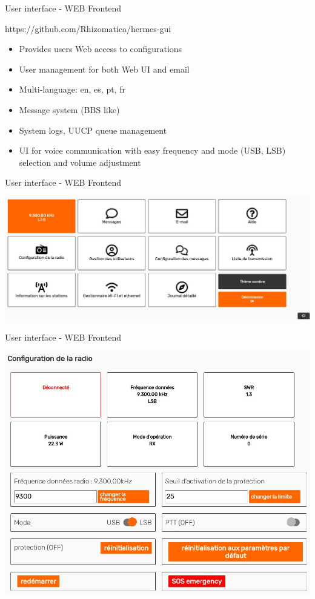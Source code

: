 \documentclass[aspectratio=169,xcolor={x11names,svgnames,dvipsnames}]{beamer}
\begin{document}
\begin{frame}{User interface - WEB Frontend}

\begin{block}{https://github.com/Rhizomatica/hermes-gui}
  \begin{itemize}
  \item Provides users Web access to configurations
  \item User management for both Web UI and email
  \item Multi-language: en, es, pt, fr
  \item Message system (BBS like)
  \item System logs, UUCP queue management
  \item UI for voice communication with easy frequency and mode (USB, LSB) selection and volume adjustment
  \end{itemize}
\end{block}

\end{frame}

\begin{frame}{User interface - WEB Frontend}

  \vspace{-0.15cm}
  \begin{center}
    \includegraphics[width=.9\columnwidth]{hermes-ui2.jpg}


  \end{center}


\end{frame}

\begin{frame}{User interface - WEB Frontend}

  \vspace{-0.15cm}
  \begin{center}
    \includegraphics[width=.6\columnwidth]{hermes-ui3.jpg}
  \end{center}


\end{frame}
\end{document}
